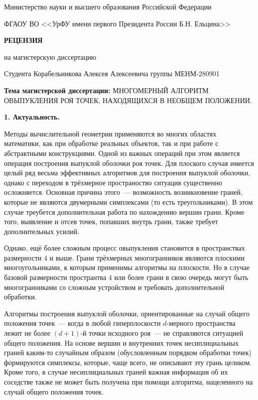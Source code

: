 \documentclass[12pt]{article}
\begin{document}
\begin{center}

Министерство науки и высшего образования Российской Федерации

\smallskip

ФГАОУ ВО <<УрФУ имени первого Президента России Б.Н. Ельцина>>

\medskip

\large

\textbf{РЕЦЕНЗИЯ}

на магистерскую диссертацию

Студента Корабельникова Алексея Алексеевича группы МЕНМ-280901

\medskip

\normalsize

\raggedright

\noindent
\textbf{Тема магистерской диссертации:} МНОГОМЕРНЫЙ АЛГОРИТМ ОВЫПУКЛЕНИЯ РОЯ ТОЧЕК, НАХОДЯЩИХСЯ В НЕОБЩЕМ ПОЛОЖЕНИИ.
\end{center}

\noindent
\textbf{1. Актуальность.}

\smallskip

Методы вычислительной геометрии применяются во многих областях математики, как при обработке реальных объектов, так и при работе с абстрактными конструкциями. Одной из важных операций при этом является операция построения выпуклой оболочки роя точек. Для плоского случая имеется целый ряд весьма эффективных алгоритмов для построения выпуклой оболочки, однако с переходом в трёхмерное пространоство ситуация существенно осложняется. Основная причина этого~--- возможность возникновение граней, которые не являются двумерными симплексами (то есть треугольниками). В этом случае треубется дополнительная работа по нахождению вершин грани. Кроме того, выявление и отсев точек, попавших внутрь грани, также требует дополнительных усилий.

Однако, ещё более сложным процесс овыпукления становится в пространствах размерности 4 и выше. Грани трёхмерных многогранников являются плоскими многоугольниками, к которым применимы алгоритмы на плоскости. Но в случае базовой размерности пространтва 4 или более грани в свою очередь могут быть многогранниками со сложным устройством и требовать дополнительной обработки.

Алгоритмы построения выпуклой оболочки, ориентированные на случай общего положения точек~--- когда в любой гиперплоскости $d$-мерного пространства лежит не более $(d+1)$-й точки исходного роя~--- не справляются ситуацией общего положения. На основе вершин и внутренних точек несиплициальных граней каким-то случайным образом (обусловленным порядком обработки точек) формируются симплексы, которые, чаще всего, не описывают эту грань целиком. Кроме того, в случае несиплициальных граней важная информация об их соседстве также не может быть получена при помощи алгоритма, нацеленного на случай общего положения точек.
\end{document}
